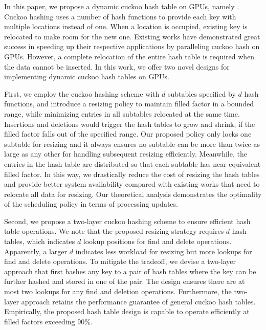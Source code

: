 In this paper, we propose a dynamic cuckoo hash table on GPUs, namely \voter. Cuckoo hashing \cite{pagh2004cuckoo} uses a number of hash functions to provide each key with multiple locations instead of one. When a location is occupied, existing key is relocated to make room for the new one. Existing works \cite{alcantara2009real,alcantara2011building,zhang2015mega,breslow2016horton} have demonstrated great success in speeding up their respective applications by paralleling cuckoo hash on GPUs. 
However, a complete relocation of the entire hash table is required when the data cannot be  inserted.
In this work, we offer two novel designs for implementing dynamic cuckoo hash tables on GPUs.

First, we employ the cuckoo hashing scheme with $d$ subtables specified by $d$ hash functions, and introduce a resizing policy to maintain filled factor in a bounded range, while minimizing entries in all subtables relocated at the same time. Insertions and deletions would trigger the hash tables to grow and shrink, if the filled factor falls out of the specified range. 
Our proposed policy only locks one subtable for resizing and it always ensures no subtable can be more than twice as large as any other for handling subsequent resizing efficiently. Meanwhile, the entries in the hash table are distributed so that each subtable has near-equivalent filled factor.
In this way, we drastically reduce the cost of resizing the hash tables and provide better system availability compared with existing works that need to relocate all data for resizing.
Our theoretical analysis demonstrates the optimality of the scheduling policy in terms of processing updates. 

Second, we propose a two-layer cuckoo hashing scheme to ensure efficient hash table operations. 
We note that the proposed resizing strategy requires $d$ hash tables, which indicates $d$ lookup positions for find and delete operations. Apparently, a larger $d$ indicates less workload for resizing but more lookups for find and delete operations. To mitigate the tradeoff, we devise a two-layer approach that first hashes any key to a pair of hash tables where the key can be further hashed and stored in one of the pair. 
The design ensures there are at most two lookups for any find and deletion operations.
Furthermore, the two-layer approach retains the performance guarantee of general cuckoo hash tables.
Empirically, the proposed hash table design is capable to operate efficiently at filled factors exceeding 90\%.

